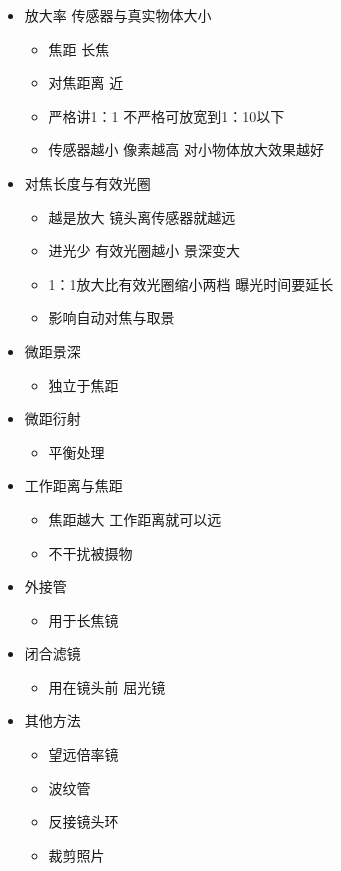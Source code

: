 \documentclass[
  letterpaper,
  DIV=11,
  numbers=noendperiod]{scrreprt}
\providecommand{\tightlist}{%
  \setlength{\itemsep}{0pt}\setlength{\parskip}{0pt}}\usepackage{longtable,booktabs,array}
\begin{document}
\begin{itemize}
\tightlist
\item
  放大率 传感器与真实物体大小

  \begin{itemize}
  \tightlist
  \item
    焦距 长焦
  \item
    对焦距离 近
  \item
    严格讲1：1 不严格可放宽到1：10以下
  \item
    传感器越小 像素越高 对小物体放大效果越好
  \end{itemize}
\item
  对焦长度与有效光圈

  \begin{itemize}
  \tightlist
  \item
    越是放大 镜头离传感器就越远
  \item
    进光少 有效光圈越小 景深变大
  \item
    1：1放大比有效光圈缩小两档 曝光时间要延长
  \item
    影响自动对焦与取景
  \end{itemize}
\item
  微距景深

  \begin{itemize}
  \tightlist
  \item
    独立于焦距
  \end{itemize}
\item
  微距衍射

  \begin{itemize}
  \tightlist
  \item
    平衡处理
  \end{itemize}
\item
  工作距离与焦距

  \begin{itemize}
  \tightlist
  \item
    焦距越大 工作距离就可以远
  \item
    不干扰被摄物
  \end{itemize}
\item
  外接管

  \begin{itemize}
  \tightlist
  \item
    用于长焦镜
  \end{itemize}
\item
  闭合滤镜

  \begin{itemize}
  \tightlist
  \item
    用在镜头前 屈光镜
  \end{itemize}
\item
  其他方法

  \begin{itemize}
  \tightlist
  \item
    望远倍率镜
  \item
    波纹管
  \item
    反接镜头环
  \item
    裁剪照片
  \end{itemize}
\end{itemize}
\end{document}
